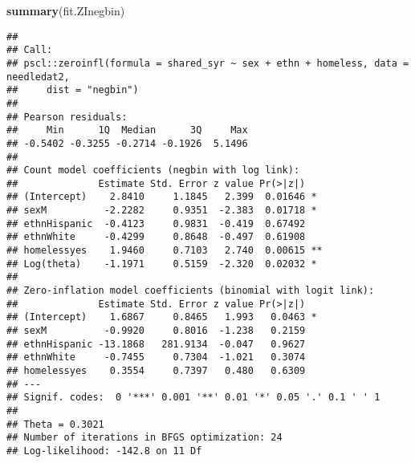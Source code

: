 \documentclass[
  ignorenonframetext,
]{beamer}
\newenvironment{Shaded}{\begin{snugshade}}{\end{snugshade}}
\newcommand{\KeywordTok}[1]{\textcolor[rgb]{0.13,0.29,0.53}{\textbf{#1}}}
\newcommand{\NormalTok}[1]{#1}
\begin{document}
\begin{frame}[fragile]{}
\protect\hypertarget{section-2}{}

\tiny

\begin{Shaded}
\begin{Highlighting}[]
\KeywordTok{summary}\NormalTok{(fit.ZInegbin)}
\end{Highlighting}
\end{Shaded}

\begin{verbatim}
## 
## Call:
## pscl::zeroinfl(formula = shared_syr ~ sex + ethn + homeless, data = needledat2, 
##     dist = "negbin")
## 
## Pearson residuals:
##     Min      1Q  Median      3Q     Max 
## -0.5402 -0.3255 -0.2714 -0.1926  5.1496 
## 
## Count model coefficients (negbin with log link):
##              Estimate Std. Error z value Pr(>|z|)   
## (Intercept)    2.8410     1.1845   2.399  0.01646 * 
## sexM          -2.2282     0.9351  -2.383  0.01718 * 
## ethnHispanic  -0.4123     0.9831  -0.419  0.67492   
## ethnWhite     -0.4299     0.8648  -0.497  0.61908   
## homelessyes    1.9460     0.7103   2.740  0.00615 **
## Log(theta)    -1.1971     0.5159  -2.320  0.02032 * 
## 
## Zero-inflation model coefficients (binomial with logit link):
##              Estimate Std. Error z value Pr(>|z|)  
## (Intercept)    1.6867     0.8465   1.993   0.0463 *
## sexM          -0.9920     0.8016  -1.238   0.2159  
## ethnHispanic -13.1868   281.9134  -0.047   0.9627  
## ethnWhite     -0.7455     0.7304  -1.021   0.3074  
## homelessyes    0.3554     0.7397   0.480   0.6309  
## ---
## Signif. codes:  0 '***' 0.001 '**' 0.01 '*' 0.05 '.' 0.1 ' ' 1 
## 
## Theta = 0.3021 
## Number of iterations in BFGS optimization: 24 
## Log-likelihood: -142.8 on 11 Df
\end{verbatim}

\end{frame}
\end{document}
